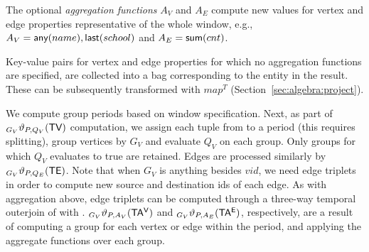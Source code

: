 The optional {\em aggregation functions} $A_V$ and $A_E$ compute new
values for vertex and edge properties representative of
the whole window, e.g., $A_V=\textsf{any}(name), \textsf{last}(school)$
and $A_E=\textsf{sum}(cnt)$.
%
 
Key-value pairs for vertex and edge properties for which no
aggregation functions are specified, are collected into a bag
corresponding to the entity in the result.  These can be subsequently
transformed with $map^T$ (Section~\ref{sec:algebra:project}).


We compute group periods based on window specification.  Next, as part
of $_{G_V}\vartheta_{P,Q_V}(\textsf{TV})$ computation, we assign each tuple from
\tv to a period (this requires splitting), group vertices by $G_V$ and
evaluate $Q_V$ on each group.  Only groups for which $Q_V$ evaluates
to true are retained.  Edges are processed similarly by
$_{G_V}\vartheta_{P,Q_E}(\textsf{TE})$.  Note that when $G_V$ is anything besides
$vid$, we need edge triplets in order to compute new source and
destination ids of each edge.  As with aggregation above, edge
triplets can be computed through a three-way temporal outerjoin of
\tae with \tav.  $_{G_V}\vartheta_{P,A_V}(\mathsf{TA^{V}})$ and
$_{G_V}\vartheta_{P,A_E}(\mathsf{TA^{E}})$, respectively, are a result of computing
a group for each vertex or edge within the period, and applying the
aggregate functions over each group.



